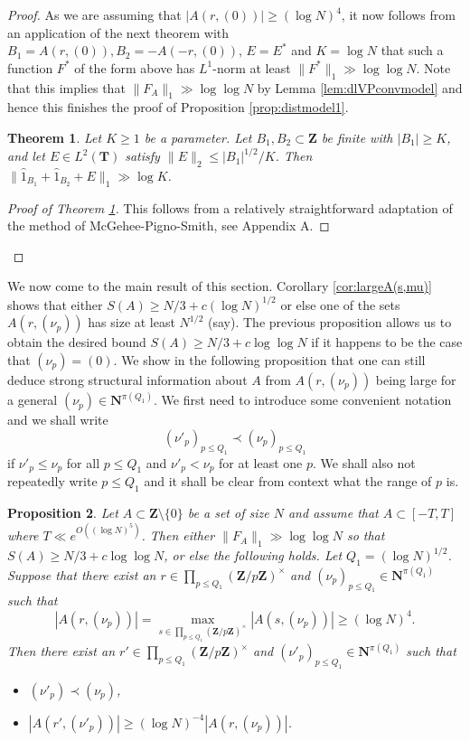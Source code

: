 \documentclass[11pt, reqno]{amsart}
\newtheorem{theorem}{Theorem}[section]
\newtheorem{proposition}[theorem]{Proposition}
\begin{document}
\begin{proof}
As we are assuming that $|A(r,(0))|\geqslant (\log N)^4$, it now follows from an application of the next theorem with $B_1=A(r,(0)), B_2=-A(-r,(0))$, $E=E^*$ and $K=\log N$ that such a function $F^*$ of the form above has $L^1$-norm at least $\lVert F^*\rVert_1\gg \log \log N$. Note that this implies that $\lVert F_A\rVert_1 \gg \log\log N$ by Lemma \ref{lem:dlVPconvmodel} and hence this finishes the proof of Proposition \ref{prop:distmodel1}.
\begin{theorem}\label{th:MPS1}
    Let $K\geqslant 1$ be a parameter. Let $B_1,B_2\subset \mathbf{Z}$ be finite with $|B_1|\geqslant K$, and let $E\in L^2(\mathbf{T})$ satisfy $\lVert E\rVert_2\leqslant |B_1|^{1/2}/K$. Then $\lVert \hat{1}_{B_1} + \hat{1}_{B_2} + E\rVert_1\gg \log K$.
\end{theorem}
\begin{proof}[Proof of Theorem \ref{th:MPS1}]
This follows from a relatively straightforward adaptation of the method of McGehee-Pigno-Smith, see Appendix A.
\end{proof}
\end{proof}
We now come to the main result of this section. Corollary \ref{cor:largeA(s,mu)} shows that either $S(A)\geqslant N/3+c(\log N)^{1/2}$ or else one of the sets $A(r,(\nu_p))$ has size at least $N^{1/2}$ (say). The previous proposition allows us to obtain the desired bound $S(A)\geqslant N/3+c\log\log N$ if it happens to be the case that $(\nu_p)=(0)$. We show in the following proposition that one can still deduce strong structural information about $A$ from $A(r,(\nu_p))$ being large for a general $(\nu_p)\in\mathbf{N}^{\pi(Q_1)}$. We first need to introduce some convenient notation and we shall write $$(\nu'_p)_{p\leqslant Q_1}\prec (\nu_p)_{p\leqslant Q_1}$$ if $\nu'_p\leqslant\nu_p$ for all $p\leqslant Q_1$ and $\nu'_p<\nu_p$ for at least one $p$. We shall also not repeatedly write $p\leqslant Q_1$ and it shall be clear from context what the range of $p$ is.
\begin{proposition}\label{prop:distmodpstruct}
    Let $A\subset\mathbf{Z}\setminus\{0\}$ be a set of size $N$ and assume that $A\subset [-T,T]$ where $T\ll e^{O((\log N)^5)}$. Then either $\lVert F_A\rVert_1 \gg \log\log N$ so that $S(A)\geqslant N/3+c\log\log N$, or else the following holds. Let $Q_1=(\log N)^{1/2}$. Suppose that there exist an $r\in \prod_{p\leqslant Q_1}\left(\mathbf{Z}/p\mathbf{Z}\right)^\times$ and $(\nu_p)_{p\leqslant Q_1}\in\mathbf{N}^{\pi(Q_1)}$ such that $$|A(r,(\nu_p))|=\max_{s\in\prod_{p\leqslant Q_1}(\mathbf{Z}/p\mathbf{Z})^\times}|A(s,(\nu_p))|\geqslant (\log N)^{4}.$$
    Then there exist an $r'\in \prod_{p\leqslant Q_1}\left(\mathbf{Z}/p\mathbf{Z}\right)^\times$ and $(\nu'_p)_{p\leqslant Q_1}\in\mathbf{N}^{\pi(Q_1)}$ such that 
    \begin{itemize}
        \item $(\nu'_p)\prec(\nu_p)$,
        \item $|A(r',(\nu'_p))|\geqslant (\log N)^{-4}|A(r,(\nu_p))|$.
    \end{itemize}
\end{proposition}
\end{document}
